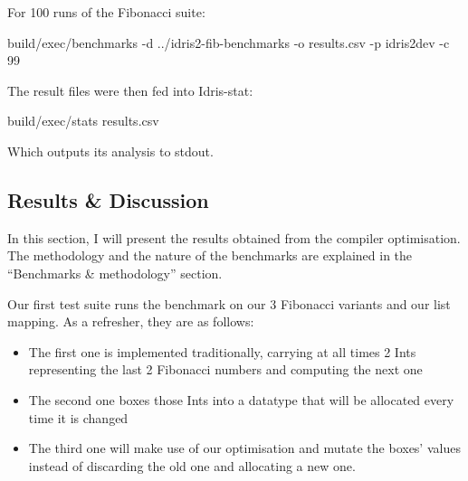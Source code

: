 \documentclass[
]{article}
\newenvironment{Shaded}{}{}
\newcommand{\DecValTok}[1]{\textcolor[rgb]{0.25,0.63,0.44}{#1}}
\newcommand{\NormalTok}[1]{#1}
\newcommand{\OperatorTok}[1]{\textcolor[rgb]{0.40,0.40,0.40}{#1}}
\providecommand{\tightlist}{%
  \setlength{\itemsep}{0pt}\setlength{\parskip}{0pt}}
\begin{document}
For 100 runs of the Fibonacci suite:

\begin{Shaded}
\begin{Highlighting}[]
\NormalTok{build}\OperatorTok{/}\NormalTok{exec}\OperatorTok{/}\NormalTok{benchmarks }\OperatorTok{{-}}\NormalTok{d }\OperatorTok{../}\NormalTok{idris2}\OperatorTok{{-}}\NormalTok{fib}\OperatorTok{{-}}\NormalTok{benchmarks }
                      \OperatorTok{{-}}\NormalTok{o results}\OperatorTok{.}\NormalTok{csv }
                      \OperatorTok{{-}}\NormalTok{p idris2dev }
                      \OperatorTok{{-}}\NormalTok{c }\DecValTok{99}
\end{Highlighting}
\end{Shaded}

The result files were then fed into Idris-stat:

\begin{Shaded}
\begin{Highlighting}[]
\NormalTok{build}\OperatorTok{/}\NormalTok{exec}\OperatorTok{/}\NormalTok{stats results}\OperatorTok{.}\NormalTok{csv}
\end{Highlighting}
\end{Shaded}

Which outputs its analysis to stdout.

\hypertarget{results-discussion}{%
\subsection{Results \& Discussion}\label{results-discussion}}

In this section, I will present the results obtained from the compiler
optimisation. The methodology and the nature of the benchmarks are
explained in the ``Benchmarks \& methodology'' section.

Our first test suite runs the benchmark on our 3 Fibonacci variants and
our list mapping. As a refresher, they are as follows:

\begin{itemize}
\tightlist
\item
  The first one is implemented traditionally, carrying at all times 2
  Ints representing the last 2 Fibonacci numbers and computing the next
  one
\item
  The second one boxes those Ints into a datatype that will be allocated
  every time it is changed
\item
  The third one will make use of our optimisation and mutate the boxes'
  values instead of discarding the old one and allocating a new one.
\end{itemize}
\end{document}
